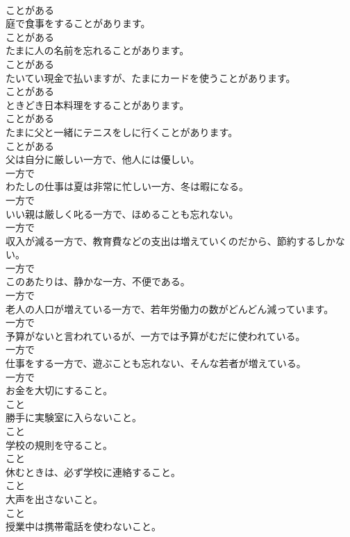 \documentclass[8pt]{extreport}
\begin{document}
\begin{CJK}{UTF8}{min}
\\	ことがある
\\	庭で食事をすることがあります。	
\\	ことがある
\\	たまに人の名前を忘れることがあります。	
\\	ことがある
\\	たいてい現金で払いますが、たまにカードを使うことがあります。	
\\	ことがある
\\	ときどき日本料理をすることがあります。	
\\	ことがある
\\	たまに父と一緒にテニスをしに行くことがあります。	
\\	ことがある
\\	父は自分に厳しい一方で、他人には優しい。	
\\	一方で
\\	わたしの仕事は夏は非常に忙しい一方、冬は暇になる。	
\\	一方で
\\	いい親は厳しく叱る一方で、ほめることも忘れない。	
\\	一方で
\\	収入が減る一方で、教育費などの支出は増えていくのだから、節約するしかない。	
\\	一方で
\\	このあたりは、静かな一方、不便である。	
\\	一方で
\\	老人の人口が増えている一方で、若年労働力の数がどんどん減っています。	
\\	一方で
\\	予算がないと言われているが、一方では予算がむだに使われている。	
\\	一方で
\\	仕事をする一方で、遊ぶことも忘れない、そんな若者が増えている。	
\\	一方で
\\	お金を大切にすること。	
\\	こと
\\	勝手に実験室に入らないこと。	
\\	こと
\\	学校の規則を守ること。	
\\	こと
\\	休むときは、必ず学校に連絡すること。	
\\	こと
\\	大声を出さないこと。	
\\	こと
\\	授業中は携帯電話を使わないこと。	

\end{CJK}
\end{document}
